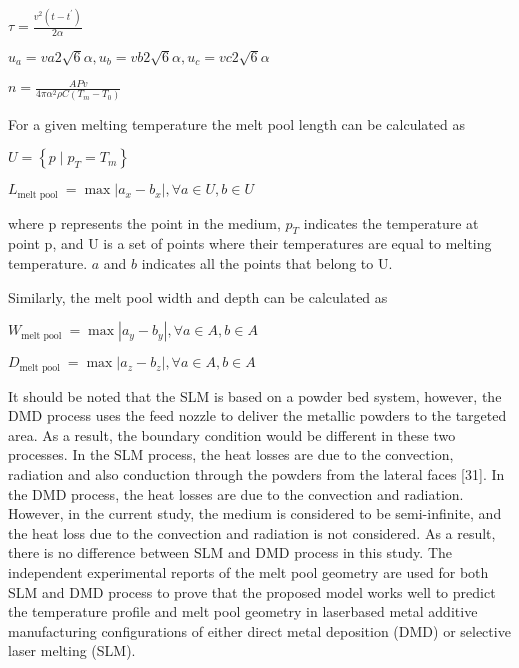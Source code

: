 \documentclass[10pt]{article}
\begin{document}
$\tau=\frac{v^{2}\left(t-t^{\prime}\right)}{2 \alpha}$

$u_{a}=v a 2 \sqrt{6} \alpha, u_{b}=v b 2 \sqrt{6} \alpha, u_{c}=v c 2 \sqrt{6} \alpha$

$n=\frac{A P v}{4 \pi \alpha^{2} \rho C\left(T_{m}-T_{0}\right)}$

For a given melting temperature the melt pool length can be calculated as

$U=\left\{p \mid p_{T}=T_{m}\right\}$

$L_{\text {melt pool }}=\max \left|a_{x}-b_{x}\right|, \forall a \in U, b \in U$

where $\mathrm{p}$ represents the point in the medium, $p_{T}$ indicates the temperature at point $\mathrm{p}$, and $\mathrm{U}$ is a set of points where their temperatures are equal to melting temperature. $a$ and $b$ indicates all the points that belong to U.

Similarly, the melt pool width and depth can be calculated as

$W_{\text {melt pool }}=\max \left|a_{y}-b_{y}\right|, \forall a \in A, b \in A$

$D_{\text {melt pool }}=\max \left|a_{z}-b_{z}\right|, \forall a \in A, b \in A$

It should be noted that the SLM is based on a powder bed system, however, the DMD process uses the feed nozzle to deliver the metallic powders to the targeted area. As a result, the boundary condition would be different in these two processes. In the SLM process, the heat losses are due to the convection, radiation and also conduction through the powders from the lateral faces [31]. In the DMD process, the heat losses are due to the convection and radiation. However, in the current study, the medium is considered to be semi-infinite, and the heat loss due to the convection and radiation is not considered. As a result, there is no difference between SLM and DMD process in this study. The independent experimental reports of the melt pool geometry are used for both SLM and DMD process to prove that the proposed model works well to predict the temperature profile and melt pool geometry in laserbased metal additive manufacturing configurations of either direct metal deposition (DMD) or selective laser melting (SLM).
\end{document}
